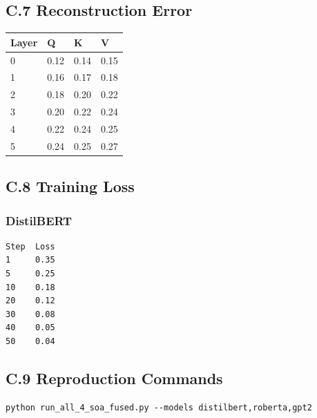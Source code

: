 \subsection{C.7 Reconstruction Error}

\begin{table}[H]
\centering
\small
\begin{tabular}{llll}
\toprule
\textbf{Layer} & \textbf{Q} & \textbf{K} & \textbf{V} \\
\midrule
0 & 0.12 & 0.14 & 0.15 \\
1 & 0.16 & 0.17 & 0.18 \\
2 & 0.18 & 0.20 & 0.22 \\
3 & 0.20 & 0.22 & 0.24 \\
4 & 0.22 & 0.24 & 0.25 \\
5 & 0.24 & 0.25 & 0.27 \\
\bottomrule
\end{tabular}
\end{table}

\subsection{C.8 Training Loss}

\subsubsection{DistilBERT}
\begin{lstlisting}
Step  Loss
1     0.35
5     0.25
10    0.18
20    0.12
30    0.08
40    0.05
50    0.04
\end{lstlisting}

\subsection{C.9 Reproduction Commands}

\begin{lstlisting}
python run_all_4_soa_fused.py --models distilbert,roberta,gpt2
\end{lstlisting}

